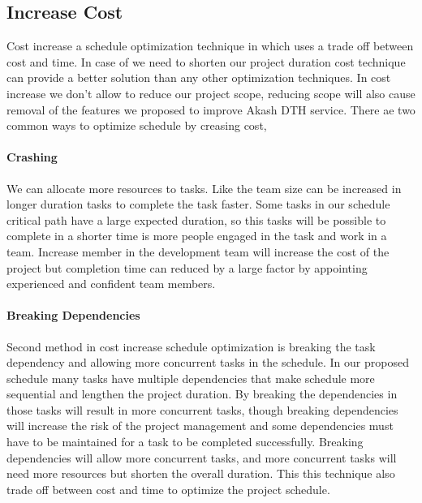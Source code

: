 \begin{spacing}{1}
\subsection{Increase Cost}
Cost increase a schedule optimization technique in which uses a trade off between cost and time. In case of we need to shorten our project duration cost technique can provide a better solution than any other optimization techniques. In cost increase we don't allow to reduce our project scope, reducing scope will also cause removal of the features we proposed to improve Akash DTH service. There ae two common ways to optimize schedule by creasing cost,
\paragraph{Crashing} We can allocate more resources to tasks. Like the team size can be increased in longer duration tasks to complete the task faster. Some tasks in our schedule critical path have a large expected duration, so this tasks will be possible to complete in a shorter time is more people engaged in the task and work in a team. Increase member in the development team will increase the cost of the project but completion time can reduced by a large factor by appointing experienced and confident team members.
\paragraph{Breaking Dependencies} Second method in cost increase schedule optimization is breaking the task dependency and allowing more concurrent tasks in the schedule. In our proposed schedule many tasks have multiple dependencies that make schedule more sequential and lengthen the project duration. By breaking the dependencies in those tasks will result in more concurrent tasks, though breaking dependencies will increase the risk of the project management and some dependencies must have to be maintained for a task to be completed successfully. Breaking dependencies will allow more concurrent tasks, and more concurrent  tasks will need more resources but shorten the overall duration. This this technique also trade off between cost and time to optimize the project schedule.


\end{spacing}
